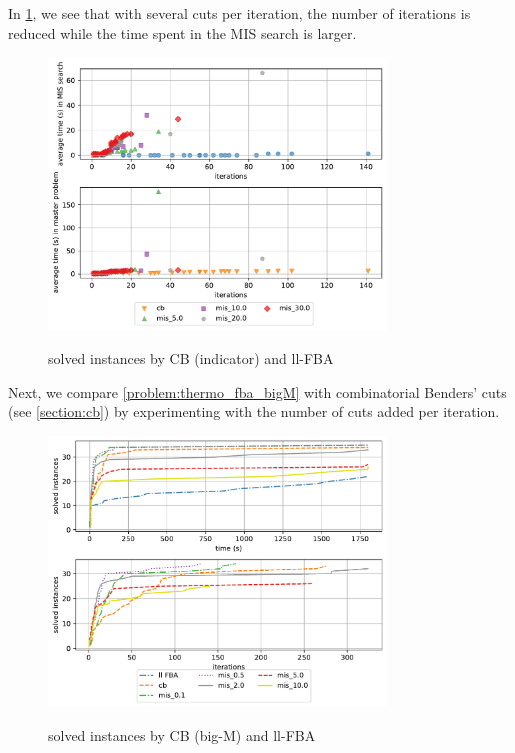 In \cref{fig:mis_comparison_time_vs_iterations}, we see that with several cuts per iteration, the number of iterations is reduced while the time spent in the MIS search is larger.  

\begin{figure}[h!]
    \caption{solved instances by CB (indicator) and ll-FBA}
    \centering
    \includegraphics[width=0.8\textwidth]{Images/mis_comparison_time_vs_iterations.pdf}
    \label{fig:mis_comparison_time_vs_iterations}
\end{figure}

Next, we compare \cref{problem:thermo_fba_bigM} with combinatorial Benders' cuts (see \cref{section:cb}) by experimenting with the number of cuts added per iteration. 

\begin{figure}[h!]
    \caption{solved instances by CB (big-M) and ll-FBA}
    \centering
    \includegraphics[width=0.8\textwidth]{Images/mis_comparison_solved_instances_big_m.pdf}
    \label{fig:mis_comparison_solved_instances_big_m}
\end{figure}

